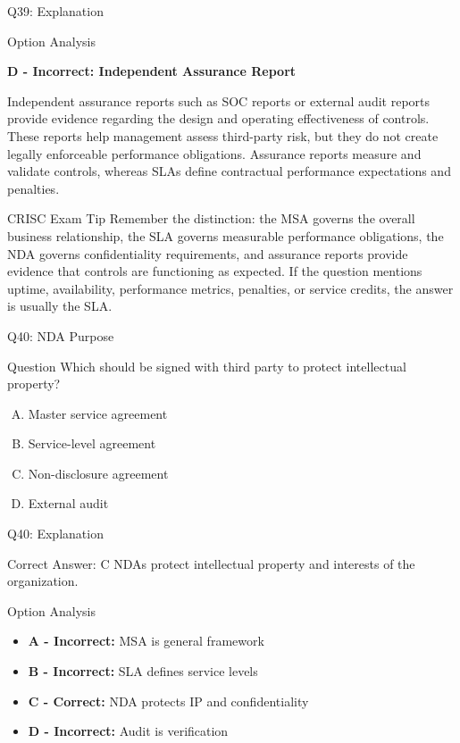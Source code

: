 \documentclass{beamer}
\begin{document}
\begin{frame}{Q39: Explanation}
\begin{block}{Option Analysis}
		\vspace{0.2cm}
		
		\textbf{D - Incorrect: Independent Assurance Report}
		
		Independent assurance reports such as SOC reports or external
		audit reports provide evidence regarding the design and operating
		effectiveness of controls. These reports help management assess
		third-party risk, but they do not create legally enforceable
		performance obligations. Assurance reports measure and validate
		controls, whereas SLAs define contractual performance
		expectations and penalties.
		
	\end{block}
	
	\begin{block}{CRISC Exam Tip}
		Remember the distinction: the MSA governs the overall business
		relationship, the SLA governs measurable performance obligations,
		the NDA governs confidentiality requirements, and assurance
		reports provide evidence that controls are functioning as
		expected. If the question mentions uptime, availability,
		performance metrics, penalties, or service credits, the answer is
		usually the SLA.
	\end{block}
\end{frame}
	
	\begin{frame}{Q40: NDA Purpose}
		\begin{block}{Question}
			Which should be signed with third party to protect intellectual property?
		\end{block}
		\begin{enumerate}[(A)]
			\item Master service agreement
			\item Service-level agreement
			\item Non-disclosure agreement
			\item External audit
		\end{enumerate}
	\end{frame}
	
	\begin{frame}{Q40: Explanation}
		\begin{block}{Correct Answer: C}
			NDAs protect intellectual property and interests of the organization.
		\end{block}
		\begin{block}{Option Analysis}
			\begin{itemize}
				\item \textbf{A - Incorrect:} MSA is general framework
				\item \textbf{B - Incorrect:} SLA defines service levels
				\item \textbf{C - Correct:} NDA protects IP and confidentiality
				\item \textbf{D - Incorrect:} Audit is verification
			\end{itemize}
		\end{block}
	\end{frame}
	
\end{document}
